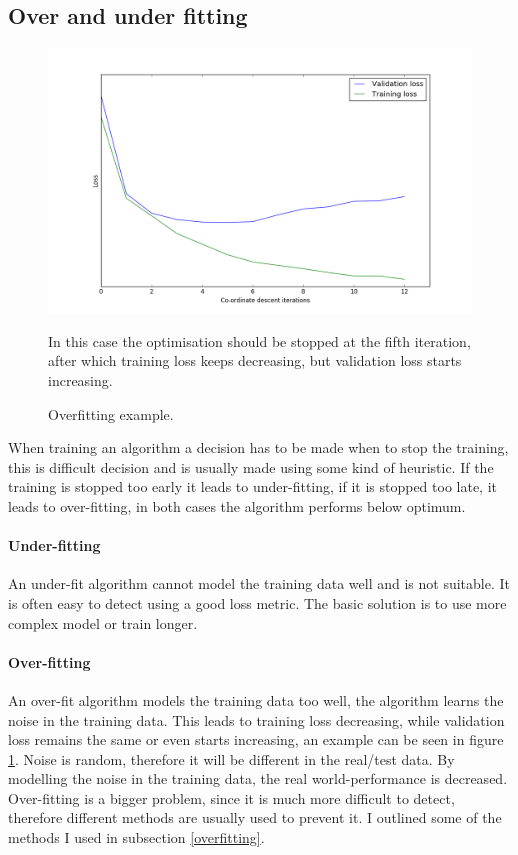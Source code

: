 \documentclass[12pt,a4paper]{book}
\newcommand\note[1]{\vspace*{-0.5\baselineskip}\caption*{#1}}
\begin{document}
\subsection{Over and under fitting}
\begin{figure}[ht]
\centering
\includegraphics[scale=0.5]{overfitting}
\caption{Overfitting example.}
\note{In this case the optimisation should be stopped at the fifth iteration, after which training loss keeps decreasing, but validation loss starts increasing.}
\label{fig:overfitting}
\end{figure}
When training an algorithm a decision has to be made when to stop the training, this is difficult decision and is usually made using some kind of heuristic.
If the training is stopped too early it leads to under-fitting, if it is stopped too late, it leads to over-fitting, in both cases the algorithm performs below optimum.
\paragraph{Under-fitting}
An under-fit algorithm cannot model the training data well and is not suitable.
It is often easy to detect using a good loss metric.
The basic solution is to use more complex model or train longer.
\paragraph{Over-fitting}
An over-fit algorithm models the training data too well, the algorithm learns the noise in the training data.
This leads to training loss decreasing, while validation loss remains the same or even starts increasing, an example can be seen in figure \ref{fig:overfitting}.
Noise is random, therefore it will be different in the real/test data.
By modelling the noise in the training data, the real world-performance is decreased.
Over-fitting is a bigger problem, since it is much more difficult to detect, therefore different methods are usually used to prevent it.
I outlined some of the methods I used in subsection \ref{overfitting}.
\end{document}
